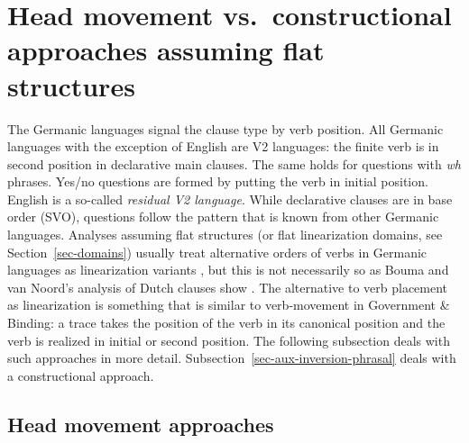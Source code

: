 \documentclass[output=paper]{langsci/langscibook}
\begin{document}

\section{Head movement vs.\ constructional approaches assuming flat structures}

The Germanic languages signal the clause type by verb position. All Germanic languages with the
exception of English are V2 languages: the finite verb is in second position in declarative main
clauses. The same holds for questions with \emph{wh} phrases. Yes/no questions are formed by putting
the verb in initial position. English is a so-called \emph{residual V2 language}. While declarative
clauses are in base order (SVO), questions follow the pattern that is known from other Germanic
languages.
\eal
\ex 
\zl
Analyses assuming flat structures (or flat linearization domains, see Section~\ref{sec-domains})
usually treat alternative orders of verbs in Germanic languages as linearization variants
\citep{Reape94a,Kathol2001a,Mueller95c,Mueller2003a,TBjerre2006a}, but this is not necessarily so as
Bouma and van Noord's analysis of Dutch clauses show \citep[, 71]{BvN98}. The alternative to
verb placement as linearization is something that is similar to verb-movement in Government \&
Binding: a trace takes the position of the verb in its canonical position and the verb is realized
in initial or second position. The following subsection deals with such approaches in more
detail. Subsection~\ref{sec-aux-inversion-phrasal} deals with a constructional approach.

\subsection{Head movement approaches}
\end{document}

